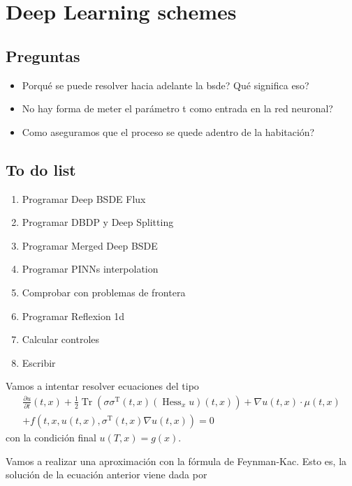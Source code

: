 \documentclass{article}
\begin{document}
	\section*{Deep Learning schemes}
	\subsection*{Preguntas}
	\begin{itemize}
		\item Porqué se puede resolver hacia adelante la bsde? Qué significa eso?
		\item No hay forma de meter el parámetro t como entrada en la red neuronal?
		\item Como aseguramos que el proceso se quede adentro de la habitación?
	\end{itemize}
\subsection*{To do list}
\begin{enumerate}
	\item Programar Deep BSDE Flux
	\item Programar DBDP y Deep Splitting 
	\item Programar Merged Deep BSDE
	\item Programar PINNs interpolation
	\item Comprobar con problemas de frontera
	\item Programar Reflexion 1d
	\item Calcular controles
	\item Escribir
\end{enumerate}
	Vamos a intentar resolver ecuaciones del tipo 
	\begin{equation}
		\begin{gathered}
			\frac{\partial u}{\partial t}(t, x)+\frac{1}{2} \operatorname{Tr}\left(\sigma \sigma^{\mathrm{T}}(t, x)\left(\operatorname{Hess}_x u\right)(t, x)\right)+\nabla u(t, x) \cdot \mu(t, x) \\
			+f\left(t, x, u(t, x), \sigma^{\mathrm{T}}(t, x) \nabla u(t, x)\right)=0
		\end{gathered}
	\end{equation}
con la condición final $u(T,x)=g(x)$.

Vamos a realizar una aproximación con la fórmula de Feynman-Kac. Esto es, la solución de la ecuación anterior viene dada por 
\end{document}
